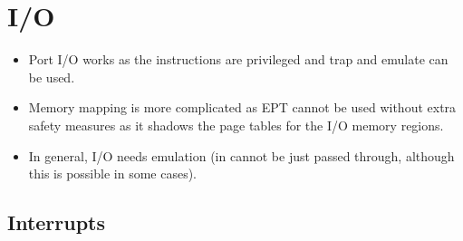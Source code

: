     \section{I/O}
        \begin{itemize}
        	\item Port I/O works as the instructions are privileged and trap and emulate can be used.
        	\item Memory mapping is more complicated as EPT cannot be used without extra safety measures as it shadows the page tables for the I/O memory regions.
        	\item In general, I/O needs emulation (in cannot be just passed through, although this is possible in some cases).
        \end{itemize}
    
        \subsection{Interrupts}
